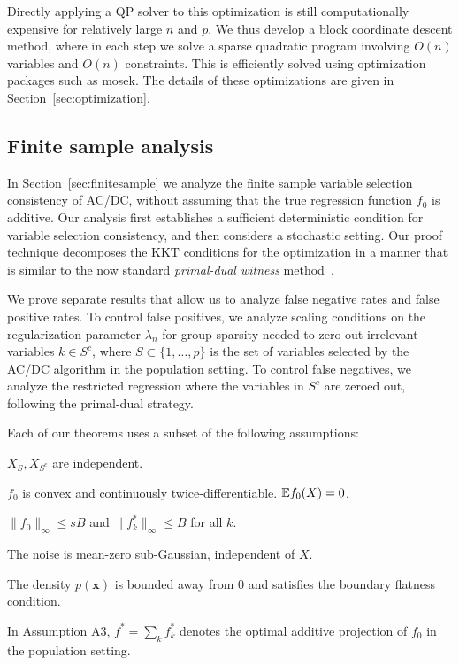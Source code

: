 Directly applying a QP solver to this optimization is still computationally
expensive for relatively large
$n$ and $p$.  We thus develop a block
coordinate descent method, where in each step we solve a sparse
quadratic program involving $O(n)$ variables and $O(n)$ constraints.  This 
is efficiently solved using optimization packages 
such as {\sc mosek}.  The details of these optimizations
are given in Section~\ref{sec:optimization}.


\subsection{Finite sample analysis}


In Section~\ref{sec:finitesample} 
we analyze the finite sample variable selection consistency of AC/DC, without assuming that the true
regression function $f_0$ is additive. Our analysis first establishes
a sufficient deterministic condition for variable selection 
consistency, and then considers a stochastic setting.
Our proof technique decomposes the KKT conditions for the optimization
in a manner that is similar to the now standard \emph{primal-dual
  witness} method~\citep{wainwright2009sharp}. 

We prove separate results that allow us to analyze false negative
rates and false positive rates.  To control false positives,
we analyze scaling conditions on the regularization parameter
$\lambda_n$ for 
group sparsity needed to zero out irrelevant variables
$k \in S^c$, where $S\subset \{1,\ldots, p\}$ is the set of
variables selected by the AC/DC algorithm in the population setting.
To control false negatives, we analyze the restricted regression
where the variables in $S^c$ are zeroed out, following the primal-dual
strategy.  



Each of our theorems uses a subset of the following assumptions:
\begin{packed_enum}
\item[A1:] $X_S, X_{S^c}$ are independent. 
\item[A2:] $f_0$ is convex and continuously twice-differentiable. ${\mathbb E} f_0(X) = 0$.
\item[A3:] $\|f_0\|_\infty \leq sB$ and $\|f^*_k \|_\infty \leq B$ for all $k$.
\item[A4:] The noise is mean-zero sub-Gaussian, independent of $X$.
\item[A5:] The density $p(\mathbf{x})$ is bounded away from 0 and satisfies the boundary flatness condition.
\end{packed_enum}
In Assumption A3, $f^*=\sum_k f^*_k$ denotes the optimal additive projection of $f_0$ in the population setting.

